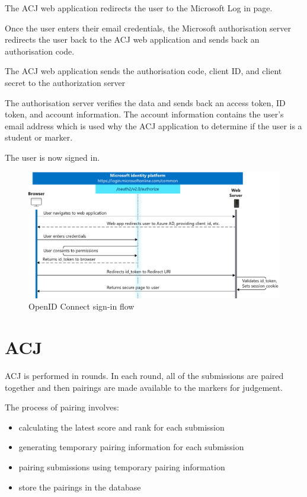 \documentclass{l4proj}
\begin{document}
The ACJ web application redirects the user to the Microsoft Log in page.

Once the user enters their email credentials, the Microsoft authorisation server redirects the user back to the ACJ web application and sends back an authorisation code.

The ACJ web application sends the authorisation code, client ID, and client secret to the authorization server

The authorisation server verifies the data and sends back an access token, ID token, and account information. The account information contains the user’s email address which is used why the ACJ application to determine if the user is a student or marker.
	
The user is now signed in.
	

\begin{figure}[h]
\begin{center}
    \includegraphics[width=0.85\linewidth]{images/convergence-scenarios-webapp.pdf}  
    \caption{OpenID Connect sign-in flow \citep{openid}}
\end{center}
\end{figure}



\section{ACJ}

ACJ is performed in rounds. In each round, all of the submissions are paired together and then pairings are made available to the markers for judgement.

The process of pairing involves: 
\begin{itemize}
  \item calculating the latest score and rank for each submission
  \item generating temporary pairing information for each submission
  \item pairing submissions using temporary pairing information
  \item store the pairings in the database
\end{itemize}
    
\end{document}
